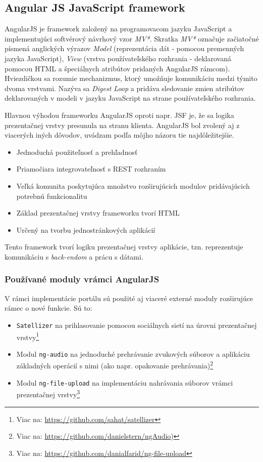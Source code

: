 \documentclass[12pt,oneside]{fithesis2}
\begin{document}
		\subsection{Angular JS JavaScript framework}
      		\par AngularJS je framework založený na programovacom jazyku JavaScript a implementujúci softvérový návrhový vzor \textit{MV*}. Skratka \textit{MV*} označuje začiatočné písmená anglických výrazov \textit{Model} (reprezentácia dát - pomocou premenných jazyka JavaScript), \textit{View} (vrstva používateľského rozhrania - deklarovaná pomocou HTML a špeciálnych atribútov pridaných AngularJS rámcom). Hviezdičkou sa rozumie mechanizmus, ktorý umožňuje komunikáciu medzi týmito dvoma vrstvami. Nazýva sa \textit{Digest Loop} a pridáva sledovanie zmien atribútov deklarovaných v modeli v jazyku JavaScript na strane používateľského rozhrania\cite{angularudemy}.  
			\par Hlavnou výhodou frameworku AngularJS oproti napr. JSF je, že sa logika prezentačnej vrstvy presunula na stranu klienta. \cite{hades14} AngularJS bol zvolený aj z viacerých iných dôvodov, uvádzam podľa môjho názoru tie najdôležitejšie. 
	\begin{itemize}
		\item Jednoduchá použiteľnosť a prehľadnosť
		\item Priamočiara integrovateľnosť s REST rozhraním
		\item Veľká komunita poskytujúca množstvo rozširujúcich modulov pridávajúcich potrebnú funkcionalitu
		\item Základ prezentačnej vrstvy frameworku tvorí HTML
		\item Určený na tvorbu jednostránkových aplikácií
	\end{itemize} 
	\par Tento framework tvorí logiku prezentačnej vrstvy aplikácie, tzn. reprezentuje komunikáciu s \textit{back-endom} a prácu s dátami.
			\subsubsection{Používané moduly vrámci AngularJS}
			\par V rámci implementácie portálu sú použité aj viaceré externé moduly rozširujúce rámec o nové funkcie. Sú to:
	\begin{itemize}
		\item \texttt{Satellizer} na prihlasovanie pomocou sociálnych sietí na úrovni prezentačnej vrstvy\footnote{Viac na: \url{https://github.com/sahat/satellizer}}
		\item Modul \texttt{ng-audio} na jednoduché prehrávanie zvukových súborov a aplikáciu základných operácií s nimi (ako napr. opakovanie prehrávania)\footnote{Viac na: \url{https://github.com/danielstern/ngAudio})}
		\item Modul \texttt{ng-file-upload} na implementáciu nahrávania súborov vrámci prezentačnej vrstvy\footnote{Viac na: \url{https://github.com/danialfarid/ng-file-upload}}
	\end{itemize}
	
\end{document}

